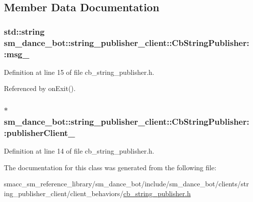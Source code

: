\subsection{Member Data Documentation}
\subsubsection[{\texorpdfstring{msg\+\_\+}{msg_}}]{\setlength{\rightskip}{0pt plus 5cm}std\+::string sm\+\_\+dance\+\_\+bot\+::string\+\_\+publisher\+\_\+client\+::\+Cb\+String\+Publisher\+::msg\+\_\+}\hypertarget{classsm__dance__bot_1_1string__publisher__client_1_1CbStringPublisher_a838e820800dd07fdf1179735fe727b12}{}\label{classsm__dance__bot_1_1string__publisher__client_1_1CbStringPublisher_a838e820800dd07fdf1179735fe727b12}


Definition at line 15 of file cb\+\_\+string\+\_\+publisher.\+h.



Referenced by on\+Exit().

\subsubsection[{\texorpdfstring{publisher\+Client\+\_\+}{publisherClient_}}]{$\ast$ sm\+\_\+dance\+\_\+bot\+::string\+\_\+publisher\+\_\+client\+::\+Cb\+String\+Publisher\+::publisher\+Client\+\_\+}\hypertarget{classsm__dance__bot_1_1string__publisher__client_1_1CbStringPublisher_ab193cff488df923ffc0fcc1939c487f5}{}\label{classsm__dance__bot_1_1string__publisher__client_1_1CbStringPublisher_ab193cff488df923ffc0fcc1939c487f5}


Definition at line 14 of file cb\+\_\+string\+\_\+publisher.\+h.



The documentation for this class was generated from the following file\+:\begin{DoxyCompactItemize}
\item 
smacc\+\_\+sm\+\_\+reference\+\_\+library/sm\+\_\+dance\+\_\+bot/include/sm\+\_\+dance\+\_\+bot/clients/string\+\_\+publisher\+\_\+client/client\+\_\+behaviors/\hyperlink{cb__string__publisher_8h}{cb\+\_\+string\+\_\+publisher.\+h}\end{DoxyCompactItemize}
